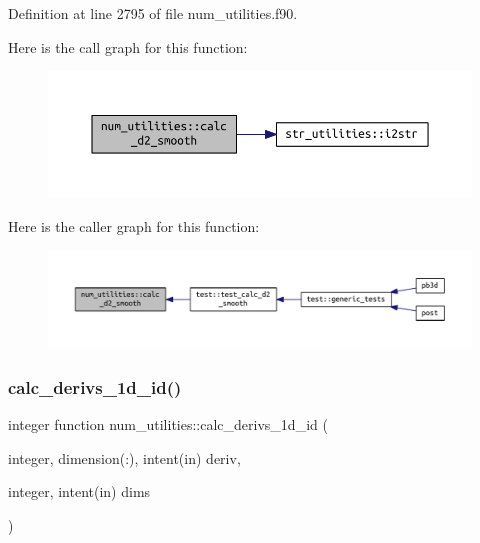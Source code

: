Definition at line 2795 of file num\+\_\+utilities.\+f90.

Here is the call graph for this function\+:\nopagebreak
\begin{figure}[H]
\begin{center}
\leavevmode
\includegraphics[width=350pt]{namespacenum__utilities_ab4c91a6478c4dd6f519f8ccbccc4094f_cgraph}
\end{center}
\end{figure}
Here is the caller graph for this function\+:\nopagebreak
\begin{figure}[H]
\begin{center}
\leavevmode
\includegraphics[width=350pt]{namespacenum__utilities_ab4c91a6478c4dd6f519f8ccbccc4094f_icgraph}
\end{center}
\end{figure}
\mbox{\label{namespacenum__utilities_af2e9ffd7ce2f9391bf8b6f1c344fabca}} 
\subsubsection{\texorpdfstring{calc\+\_\+derivs\+\_\+1d\+\_\+id()}{calc\_derivs\_1d\_id()}}
{\footnotesize\ttfamily integer function num\+\_\+utilities\+::calc\+\_\+derivs\+\_\+1d\+\_\+id (\begin{DoxyParamCaption}\item[{integer, dimension(\+:), intent(in)}]{deriv,  }\item[{integer, intent(in)}]{dims }\end{DoxyParamCaption})}



